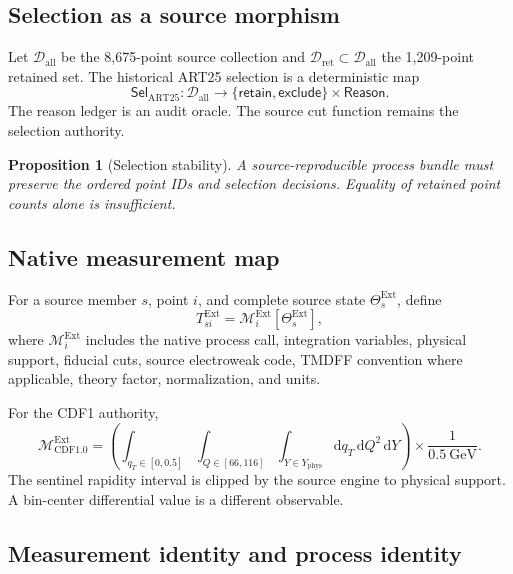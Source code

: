 \documentclass[11pt]{article}
\newtheorem{proposition}[definition]{Proposition}
\newcommand{\dd}{\mathrm{d}}
\newcommand{\cM}{\mathcal M}
\newcommand{\cD}{\mathcal D}
\newcommand{\Ext}{\ensuremath{\mathrm{Ext}}}
\begin{document}
\subsection{Selection as a source morphism}

Let \(\cD_{\mathrm{all}}\) be the 8,675-point source collection and \(\cD_{\mathrm{ret}}\subset\cD_{\mathrm{all}}\) the 1,209-point retained set.  The historical ART25 selection is a deterministic map
\begin{equation}
 \mathsf{Sel}_{\mathrm{ART25}}:\cD_{\mathrm{all}}
 \longrightarrow
 \{\mathsf{retain},\mathsf{exclude}\}\times\mathsf{Reason}.
 \label{eq:selection-map}
\end{equation}
The reason ledger is an audit oracle.  The source cut function remains the selection authority.

\begin{proposition}[Selection stability]
A source-reproducible process bundle must preserve the ordered point IDs and selection decisions.  Equality of retained point counts alone is insufficient.
\end{proposition}

\subsection{Native measurement map}

For a source member \(s\), point \(i\), and complete source state \(\Theta_s^{\Ext}\), define
\begin{equation}
 T_{si}^{\Ext}
 =
 \cM_i^{\Ext}[\Theta_s^{\Ext}],
 \label{eq:native-measurement-map}
\end{equation}
where \(\cM_i^{\Ext}\) includes the native process call, integration variables, physical support, fiducial cuts, source electroweak code, TMDFF convention where applicable, theory factor, normalization, and units.

For the CDF1 authority,
\begin{equation}
 \cM_{\mathrm{CDF1.0}}^{\Ext}
 =
 \left(
 \int_{q_T\in[0,0.5]}
 \int_{Q\in[66,116]}
 \int_{Y\in Y_{\mathrm{phys}}}
 \dd q_T\,\dd Q^2\,\dd Y
 \right)
 \times\frac{1}{0.5\ \mathrm{GeV}}.
 \label{eq:cdf1-map}
\end{equation}
The sentinel rapidity interval is clipped by the source engine to physical support.  A bin-center differential value is a different observable.

\subsection{Measurement identity and process identity}
\end{document}
